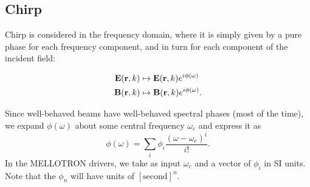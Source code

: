 \documentclass[10pt,letterpaper,extrafontsizes, onecolumn,openright]{memoir}
\begin{document}
\subsection{Chirp}

Chirp is considered in the frequency domain, where it is simply given by
a pure phase for each frequency component, and in turn for each component
of the incident field:

\begin{align}
  \vb{E}(\vb{r},k) &\mapsto \vb{E}(\vb{r},k)e^{i\phi(\omega)} \\
  \vb{B}(\vb{r},k) &\mapsto \vb{B}(\vb{r},k)e^{i\phi(\omega)}.
\end{align}

Since well-behaved beams have well-behaved spectral phases (most of the time),
we expand $\phi(\omega)$ about some central frequency $\omega_c$ and express
it as
  \begin{equation}
    \phi(\omega) = \sum_i \phi_i \frac{(\omega-\omega_c)^i}{i!}.
  \end{equation}
In the MELLOTRON drivers, we take as input $\omega_c$ and a vector of $\phi_i$
in SI units. Note that the $\phi_n$ will have units of $[\text{second}]^n$.


\appendix



\end{document}
